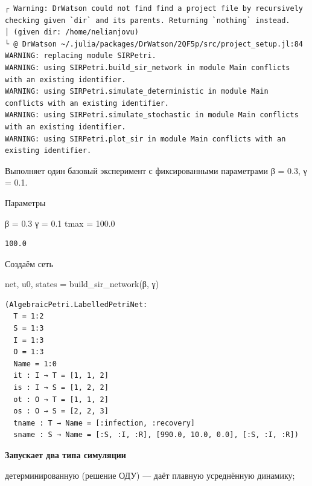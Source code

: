 \documentclass[
  12pt,
  a4paper,
  DIV=11,
  numbers=noendperiod]{scrreprt}
\newenvironment{Shaded}{\begin{snugshade}}{\end{snugshade}}
\newcommand{\FloatTok}[1]{\textcolor[rgb]{0.68,0.00,0.00}{#1}}
\newcommand{\FunctionTok}[1]{\textcolor[rgb]{0.28,0.35,0.67}{#1}}
\newcommand{\NormalTok}[1]{\textcolor[rgb]{0.00,0.23,0.31}{#1}}
\newcommand{\OperatorTok}[1]{\textcolor[rgb]{0.37,0.37,0.37}{#1}}
\begin{document}
\begin{verbatim}
┌ Warning: DrWatson could not find find a project file by recursively checking given `dir` and its parents. Returning `nothing` instead.
│ (given dir: /home/nelianjovu)
└ @ DrWatson ~/.julia/packages/DrWatson/2QF5p/src/project_setup.jl:84
WARNING: replacing module SIRPetri.
WARNING: using SIRPetri.build_sir_network in module Main conflicts with an existing identifier.
WARNING: using SIRPetri.simulate_deterministic in module Main conflicts with an existing identifier.
WARNING: using SIRPetri.simulate_stochastic in module Main conflicts with an existing identifier.
WARNING: using SIRPetri.plot_sir in module Main conflicts with an existing identifier.
\end{verbatim}

Выполняет один базовый эксперимент с фиксированными параметрами β = 0.3,
γ = 0.1.

Параметры

\begin{Shaded}
\begin{Highlighting}[]
\NormalTok{β }\OperatorTok{=} \FloatTok{0.3}
\NormalTok{γ }\OperatorTok{=} \FloatTok{0.1}
\NormalTok{tmax }\OperatorTok{=} \FloatTok{100.0}
\end{Highlighting}
\end{Shaded}

\begin{verbatim}
100.0
\end{verbatim}

Создаём сеть

\begin{Shaded}
\begin{Highlighting}[]
\NormalTok{net, u0, states }\OperatorTok{=} \FunctionTok{build\_sir\_network}\NormalTok{(β, γ)}
\end{Highlighting}
\end{Shaded}

\begin{verbatim}
(AlgebraicPetri.LabelledPetriNet:
  T = 1:2
  S = 1:3
  I = 1:3
  O = 1:3
  Name = 1:0
  it : I → T = [1, 1, 2]
  is : I → S = [1, 2, 2]
  ot : O → T = [1, 1, 2]
  os : O → S = [2, 2, 3]
  tname : T → Name = [:infection, :recovery]
  sname : S → Name = [:S, :I, :R], [990.0, 10.0, 0.0], [:S, :I, :R])
\end{verbatim}

\textbf{Запускает два типа симуляции}

детерминированную (решение ОДУ) --- даёт плавную усреднённую динамику;
\end{document}
